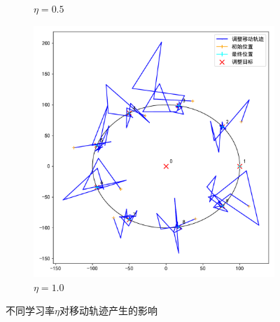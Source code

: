 \documentclass[withoutpreface,bwprint]{cumcmthesis} %
\begin{document}
\begin{figure}[H]
\begin{subfigure}{0.31\linewidth}
        \caption{$\eta=0.5$}
    \end{subfigure}
    \begin{subfigure}{0.32\linewidth}
        \includegraphics[width=1\linewidth]{figures/c9_lr1-0.pdf}
        \caption{$\eta=1.0$}
    \end{subfigure}
    \caption{不同学习率$\eta$对移动轨迹产生的影响}
    \label{fig:Diff_eta}
\end{figure}
\end{document}
